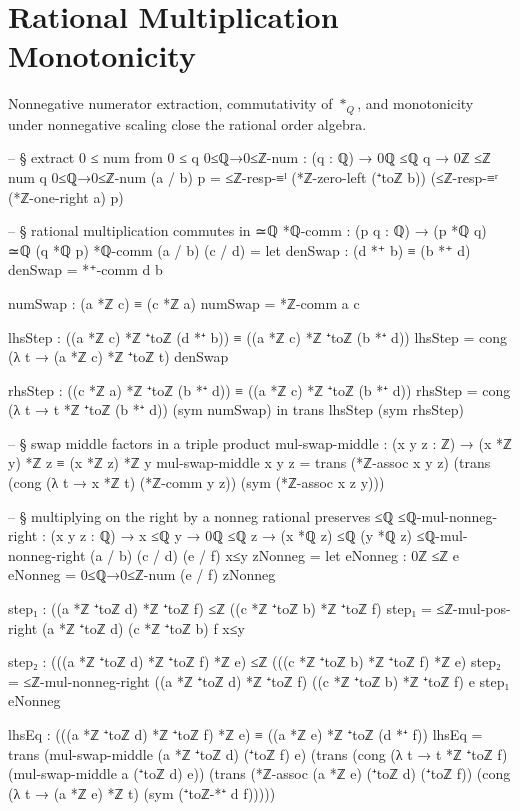 \documentclass[11pt,a4paper]{book}
\def\mathbb#1{#1}%
\begin{document}
\section{Rational Multiplication Monotonicity}

Nonnegative numerator extraction, commutativity of $\ast_{\mathbb{Q}}$, and
monotonicity under nonnegative scaling close the rational order algebra.

\begin{code}
-- § extract 0 ≤ num from 0 ≤ q
0≤ℚ→0≤ℤ-num : (q : ℚ) → 0ℚ ≤ℚ q → 0ℤ ≤ℤ num q
0≤ℚ→0≤ℤ-num (a / b) p =
  ≤ℤ-resp-≡ˡ (*ℤ-zero-left (⁺toℤ b))
    (≤ℤ-resp-≡ʳ (*ℤ-one-right a) p)

-- § rational multiplication commutes in ≃ℚ
*ℚ-comm : (p q : ℚ) → (p *ℚ q) ≃ℚ (q *ℚ p)
*ℚ-comm (a / b) (c / d) =
  let
    denSwap : (d *⁺ b) ≡ (b *⁺ d)
    denSwap = *⁺-comm d b

    numSwap : (a *ℤ c) ≡ (c *ℤ a)
    numSwap = *ℤ-comm a c

    lhsStep : ((a *ℤ c) *ℤ ⁺toℤ (d *⁺ b)) ≡ ((a *ℤ c) *ℤ ⁺toℤ (b *⁺ d))
    lhsStep = cong (λ t → (a *ℤ c) *ℤ ⁺toℤ t) denSwap

    rhsStep : ((c *ℤ a) *ℤ ⁺toℤ (b *⁺ d)) ≡ ((a *ℤ c) *ℤ ⁺toℤ (b *⁺ d))
    rhsStep = cong (λ t → t *ℤ ⁺toℤ (b *⁺ d)) (sym numSwap)
  in
  trans lhsStep (sym rhsStep)

-- § swap middle factors in a triple product
mul-swap-middle : (x y z : ℤ) → (x *ℤ y) *ℤ z ≡ (x *ℤ z) *ℤ y
mul-swap-middle x y z =
  trans
    (*ℤ-assoc x y z)
    (trans
      (cong (λ t → x *ℤ t) (*ℤ-comm y z))
      (sym (*ℤ-assoc x z y)))

-- § multiplying on the right by a nonneg rational preserves ≤ℚ
≤ℚ-mul-nonneg-right : (x y z : ℚ) → x ≤ℚ y → 0ℚ ≤ℚ z → (x *ℚ z) ≤ℚ (y *ℚ z)
≤ℚ-mul-nonneg-right (a / b) (c / d) (e / f) x≤y zNonneg =
  let
    eNonneg : 0ℤ ≤ℤ e
    eNonneg = 0≤ℚ→0≤ℤ-num (e / f) zNonneg

    step₁ : ((a *ℤ ⁺toℤ d) *ℤ ⁺toℤ f) ≤ℤ ((c *ℤ ⁺toℤ b) *ℤ ⁺toℤ f)
    step₁ = ≤ℤ-mul-pos-right (a *ℤ ⁺toℤ d) (c *ℤ ⁺toℤ b) f x≤y

    step₂ : (((a *ℤ ⁺toℤ d) *ℤ ⁺toℤ f) *ℤ e) ≤ℤ (((c *ℤ ⁺toℤ b) *ℤ ⁺toℤ f) *ℤ e)
    step₂ = ≤ℤ-mul-nonneg-right ((a *ℤ ⁺toℤ d) *ℤ ⁺toℤ f) ((c *ℤ ⁺toℤ b) *ℤ ⁺toℤ f) e step₁ eNonneg

    lhsEq : (((a *ℤ ⁺toℤ d) *ℤ ⁺toℤ f) *ℤ e) ≡ ((a *ℤ e) *ℤ ⁺toℤ (d *⁺ f))
    lhsEq =
      trans
        (mul-swap-middle (a *ℤ ⁺toℤ d) (⁺toℤ f) e)
        (trans
          (cong (λ t → t *ℤ ⁺toℤ f) (mul-swap-middle a (⁺toℤ d) e))
          (trans
            (*ℤ-assoc (a *ℤ e) (⁺toℤ d) (⁺toℤ f))
            (cong (λ t → (a *ℤ e) *ℤ t) (sym (⁺toℤ-*⁺ d f)))))


\end{code}
\end{document}
